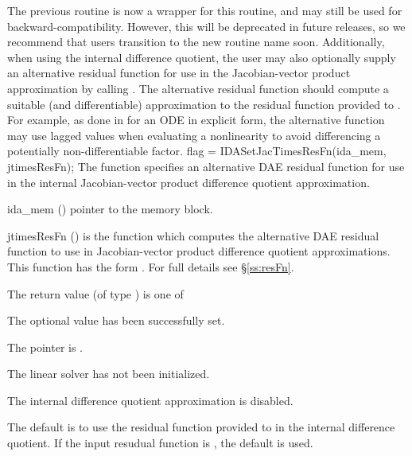 {{  The previous routine  is now a wrapper for
  this routine, and may still be used for backward-compatibility.
  However, this will be deprecated in future releases, so we recommend
  that users transition to the new routine name soon.
}
Additionally, when using the internal difference quotient, the user may also
optionally supply an alternative residual function for use in the
Jacobian-vector product approximation by calling . The
alternative residual function should compute a suitable (and differentiable)
approximation to the residual function provided to . For example,
as done in \cite{dorr2010numerical} for an ODE in explicit form, the alternative
function may use lagged values when evaluating a nonlinearity to avoid
differencing a potentially non-differentiable factor.
{
  flag = IDASetJacTimesResFn(ida\_mem, jtimesResFn);
}
{
  The function  specifies an alternative DAE residual
  function for use in the internal Jacobian-vector product difference quotient
  approximation.
}
{
  \begin{args}[jtimesResFn]
  \item[ida\_mem] ()
    pointer to the {\ida} memory block.
  \item[jtimesResFn] ()
    is the {\CC} function which computes the alternative DAE residual function
    to use in Jacobian-vector product difference quotient approximations. This
    function has the form . For full
    details see \S\ref{ss:resFn}.
  \end{args}
}
{
  The return value  (of type ) is one of
  \begin{args}
  \item[\Id{IDALS\_SUCCESS}]
    The optional value has been successfully set.
  \item[\Id{IDALS\_MEM\_NULL}]
    The  pointer is .
  \item[\Id{IDALS\_LMEM\_NULL}]
    The {\idals} linear solver has not been initialized.
  \item[\Id{IDALS\_ILL\_INPUT}]
    The internal difference quotient approximation is disabled.
  \end{args}
}
{
  The default is to use the residual function provided to  in the
  internal difference quotient. If the input resudual function is ,
  the default is used.

}}
